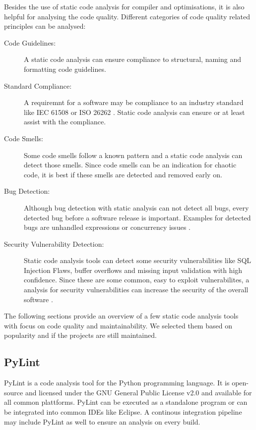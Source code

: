 Besides the use of static code analysis for compiler and optimisations, it is also helpful for analysing the code quality. Different categories of code quality related principles can be analysed:
\begin{description}
    \item[Code Guidelines:] A static code analysis can ensure compliance to structural, naming and formatting code guidelines. 
    \item[Standard Compliance:] A requiremnt for a software may be compliance to an industry standard like IEC 61508 or ISO 26262 \cite{noauthor_iec_2010,isotc_22sc_32_iso_2018}. Static code analysis can ensure or at least assist with the compliance.  
    \item[Code Smells:] Some code smells follow a known pattern and a static code analysis can detect those smells. Since code smells can be an indication for chaotic code, it is best if these smells are detected and removed early on.
    \item[Bug Detection:] Although bug detection with static analysis can not detect all bugs, every detected bug before a software release is important. Examples for detected bugs are unhandled expressions or concurrency issues \cite{delaitre_evaluating_2015}.
    \item[Security Vulnerability Detection:] Static code analysis tools can detect some security vulnerabilities like SQL Injection Flaws, buffer overflows and missing input validation with high confidence. Since these are some common, easy to exploit vulnerabilites, a analysis for security vulnerabilities can increase the security of the overall software \cite{wichers_source_nodate}.  
\end{description}

The following sections provide an overview of a few static code analysis tools with focus on code quality and maintainability. We selected them based on popularity and if the projects are still maintained.

\subsection{PyLint}
PyLint is a code analysis tool for the Python programming language. It is open-source and licensed under the GNU General Public License v2.0 and available for all common plattforms. PyLint can be executed as a standalone program or can be integrated into common IDEs like Eclipse. A continous integration pipeline may include PyLint as well to ensure an analysis on every build.

